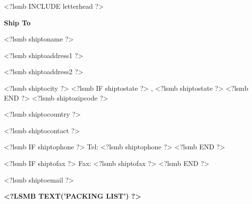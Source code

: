 \documentclass{scrartcl}
\begin{document}
\pagestyle{myheadings}
\thispagestyle{empty}

\fontsize{10pt}{12pt}\selectfont

\newsavebox{\ftr}

<?lsmb INCLUDE letterhead ?>

%
%
%


\vspace*{0.5cm}

\parbox[t]{.5\textwidth}{
\textbf{Ship To}} \hfill

\vspace{0.3cm}

\parbox[t]{.5\textwidth}{

<?lsmb shiptoname ?>

<?lsmb shiptoaddress1 ?>

<?lsmb shiptoaddress2 ?>

<?lsmb shiptocity ?>
<?lsmb IF shiptostate ?>
\hspace{-0.1cm}, <?lsmb shiptostate ?>
<?lsmb END ?>
<?lsmb shiptozipcode ?>

<?lsmb shiptocountry ?>
}
\parbox[t]{.5\textwidth}{
  <?lsmb shiptocontact ?>

  <?lsmb IF shiptophone ?>
  Tel: <?lsmb shiptophone ?>
  <?lsmb END ?>

  <?lsmb IF shiptofax ?>
  Fax: <?lsmb shiptofax ?>
  <?lsmb END ?>

  <?lsmb shiptoemail ?>
}
\hfill

\vspace{1cm}

\textbf{\MakeUppercase{<?lsmb text('Packing List') ?>}}
\hfill
\end{document}

